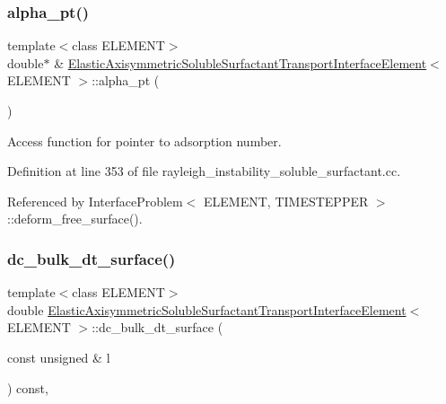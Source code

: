 \subsubsection{\texorpdfstring{alpha\+\_\+pt()}{alpha\_pt()}}
{\footnotesize\ttfamily template$<$class E\+L\+E\+M\+E\+NT$>$ \\
double$\ast$ \& \hyperlink{classElasticAxisymmetricSolubleSurfactantTransportInterfaceElement}{Elastic\+Axisymmetric\+Soluble\+Surfactant\+Transport\+Interface\+Element}$<$ E\+L\+E\+M\+E\+NT $>$\+::alpha\+\_\+pt (\begin{DoxyParamCaption}{ }\end{DoxyParamCaption})\hspace{0.3cm}{\ttfamily [inline]}}



Access function for pointer to adsorption number. 



Definition at line 353 of file rayleigh\+\_\+instability\+\_\+soluble\+\_\+surfactant.\+cc.



Referenced by Interface\+Problem$<$ E\+L\+E\+M\+E\+N\+T, T\+I\+M\+E\+S\+T\+E\+P\+P\+E\+R $>$\+::deform\+\_\+free\+\_\+surface().

\mbox{\label{classElasticAxisymmetricSolubleSurfactantTransportInterfaceElement_a7a1bdaf7177d0db70c2461a24c40a364}} 
\subsubsection{\texorpdfstring{dc\+\_\+bulk\+\_\+dt\+\_\+surface()}{dc\_bulk\_dt\_surface()}}
{\footnotesize\ttfamily template$<$class E\+L\+E\+M\+E\+NT$>$ \\
double \hyperlink{classElasticAxisymmetricSolubleSurfactantTransportInterfaceElement}{Elastic\+Axisymmetric\+Soluble\+Surfactant\+Transport\+Interface\+Element}$<$ E\+L\+E\+M\+E\+NT $>$\+::dc\+\_\+bulk\+\_\+dt\+\_\+surface (\begin{DoxyParamCaption}\item[{const unsigned \&}]{l }\end{DoxyParamCaption}) const\hspace{0.3cm}{\ttfamily [inline]}, {\ttfamily [protected]}}



